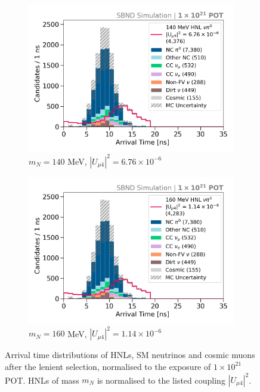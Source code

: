 \begin{figure}[hb!]
        \begin{subfigure}[b]{0.495\textwidth}
            \includegraphics[width=\textwidth]{m140}
            \caption{$m_N = 140$ MeV, $|U_{\mu4}|^2 = 6.76 \times 10^{-6}$ }
        \end{subfigure}
        \begin{subfigure}[b]{0.495\textwidth}
            \includegraphics[width=\textwidth]{m160}
            \caption{$m_N = 160$ MeV, $|U_{\mu4}|^2 = 1.14 \times 10^{-6}$ }
        \end{subfigure}
	\caption[Lenient Arrival Time Distributions in the Mass Range 140 - 160 MeV]{
	Arrival time distributions of HNLs, SM neutrinos and cosmic muons after the lenient selection, normalised to the exposure of $1 \times 10^{21}$ POT.
	HNLs of mass $m_N$ is normalised to the listed coupling $|U_{\mu4}|^2$.
	}
\end{figure}

